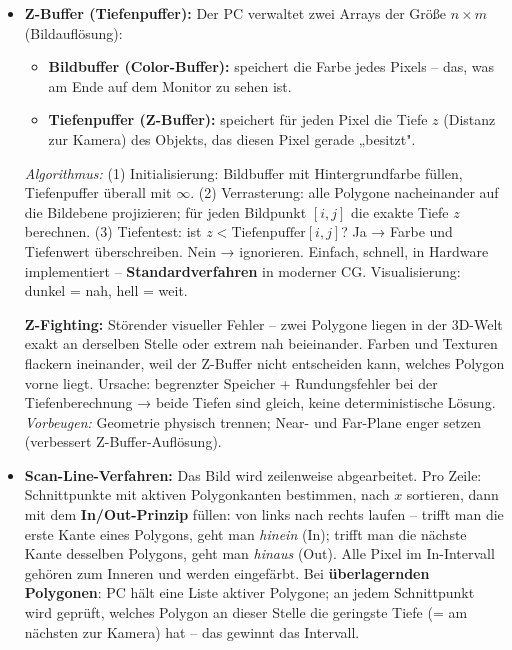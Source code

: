 \documentclass[12pt, a4paper]{article}
\begin{document}
\begin{itemize}
  \item \textbf{Z-Buffer (Tiefenpuffer):} Der PC verwaltet zwei Arrays der Größe $n \times m$ (Bildauflösung):
  \begin{itemize}
    \item \textbf{Bildbuffer (Color-Buffer):} speichert die Farbe jedes Pixels -- das, was am Ende auf dem Monitor zu sehen ist.
    \item \textbf{Tiefenpuffer (Z-Buffer):} speichert für jeden Pixel die Tiefe $z$ (Distanz zur Kamera) des Objekts, das diesen Pixel gerade „besitzt".
  \end{itemize}
  \textit{Algorithmus:} (1) Initialisierung: Bildbuffer mit Hintergrundfarbe füllen, Tiefenpuffer überall mit $\infty$. (2) Verrasterung: alle Polygone nacheinander auf die Bildebene projizieren; für jeden Bildpunkt $[i,j]$ die exakte Tiefe $z$ berechnen. (3) Tiefentest: ist $z < \text{Tiefenpuffer}[i,j]$? Ja → Farbe und Tiefenwert überschreiben. Nein → ignorieren. Einfach, schnell, in Hardware implementiert -- \textbf{Standardverfahren} in moderner CG. Visualisierung: dunkel = nah, hell = weit.

  \textbf{Z-Fighting:} Störender visueller Fehler -- zwei Polygone liegen in der 3D-Welt exakt an derselben Stelle oder extrem nah beieinander. Farben und Texturen flackern ineinander, weil der Z-Buffer nicht entscheiden kann, welches Polygon vorne liegt. Ursache: begrenzter Speicher + Rundungsfehler bei der Tiefenberechnung → beide Tiefen sind gleich, keine deterministische Lösung. \textit{Vorbeugen:} Geometrie physisch trennen; Near- und Far-Plane enger setzen (verbessert Z-Buffer-Auflösung).

  \item \textbf{Scan-Line-Verfahren:} Das Bild wird zeilenweise abgearbeitet. Pro Zeile: Schnittpunkte mit aktiven Polygonkanten bestimmen, nach $x$ sortieren, dann mit dem \textbf{In/Out-Prinzip} füllen: von links nach rechts laufen -- trifft man die erste Kante eines Polygons, geht man \textit{hinein} (In); trifft man die nächste Kante desselben Polygons, geht man \textit{hinaus} (Out). Alle Pixel im In-Intervall gehören zum Inneren und werden eingefärbt. Bei \textbf{überlagernden Polygonen}: PC hält eine Liste aktiver Polygone; an jedem Schnittpunkt wird geprüft, welches Polygon an dieser Stelle die geringste Tiefe (= am nächsten zur Kamera) hat -- das gewinnt das Intervall.


\end{itemize}
\end{document}
